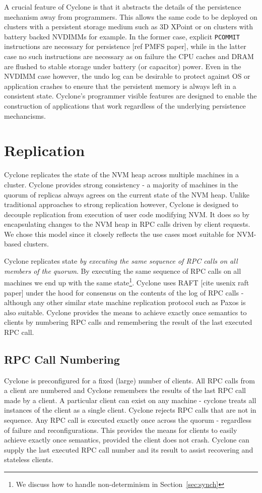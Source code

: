 \documentclass[twocolumn]{article}
\begin{document}
A crucial feature of Cyclone is that it abstracts the details of the persistence
mechanism away from programmers. This allows the same code to be deployed on
clusters with a persistent storage medium such as 3D XPoint or on clusters with
battery backed NVDIMMs for example. In the former case, explicit {\tt PCOMMIT}
instructions are necessary for persistence [ref PMFS paper], while in the latter
case no such instructions are necessary as on failure the CPU caches and DRAM
are flushed to stable storage under battery (or capacitor) power. Even in the
NVDIMM case however, the undo log can be desirable to protect against OS or
application crashes to ensure that the persistent memory is always left in a
consistent state. Cyclone's programmer visible features are designed to enable
the construction of applications that work regardless of the underlying
persistence mechancisms.


\section{Replication}
Cyclone replicates the state of the NVM heap across multiple machines in a
cluster. Cyclone provides strong consistency - a majority of machines in the
quorum of replicas always agrees on the current state of the NVM heap. Unlike
traditional approaches to strong replication however, Cyclone is designed to
decouple replication from execution of user code modifying NVM. It does so by
encapsulating changes to the NVM heap in RPC calls driven by client requests.
We chose this model since it closely reflects the use cases most suitable for
NVM-based clusters.

Cyclone replicates state \emph{by executing the same sequence of RPC calls on
  all members of the quorum}. By executing the same sequence of RPC calls on all
machines we end up with the same state\footnote{We discuss how to handle
  non-determinism in Section~\ref{sec:synch}}. Cyclone uses RAFT [cite usenix
  raft paper] under the hood for consensus on the contents of the log of RPC
calls - although any other similar state machine replication protocol such as
Paxos is also suitable. Cyclone provides the means to achieve exactly once
semantics to clients by numbering RPC calls and remembering the result of the
last executed RPC call.

\subsection{RPC Call Numbering}
Cyclone is preconfigured for a fixed (large) number of clients. All RPC calls
from a client are numbered and Cyclone remembers the results of the last RPC
call made by a client. A particular client can exist on any machine - cyclone
treats all instances of the client as a single client. Cyclone rejects RPC calls
that are not in sequence. Any RPC call is executed exactly once across the
quorum - regardless of failure and reconfigurations. This provides the means for
clients to easily achieve exactly once semantics, provided the client does not
crash. Cyclone can supply the last executed RPC call number and its result to
assist recovering and stateless clients.
\end{document}
